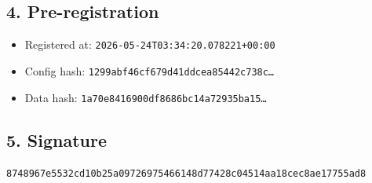 \documentclass{article}
\begin{document}
\subsection*{4. Pre-registration}
\begin{itemize}
\item Registered at: \texttt{2026-05-24T03:34:20.078221+00:00}
\item Config hash: \texttt{1299abf46cf679d41ddcea85442c738c\dots}
\item Data hash: \texttt{1a70e8416900df8686bc14a72935ba15\dots}
\end{itemize}
\subsection*{5. Signature}
\texttt{8748967e5532cd10b25a09726975466148d77428c04514aa18cec8ae17755ad8}\\
\end{document}
